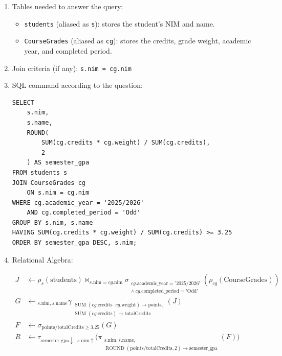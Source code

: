 \begin{enumerate}
    \itemsep0em
    \item Tables needed to answer the query:
    \begin{itemize}
        \item \texttt{students} (aliased as \texttt{s}): stores the student's NIM and name.
        \item \texttt{CourseGrades} (aliased as \texttt{cg}): stores the credits, grade weight, academic year, and completed period.
    \end{itemize}

    \item Join criteria (if any): \texttt{s.nim = cg.nim}

    \item SQL command according to the question:
    \begin{lstlisting}
SELECT
    s.nim,
    s.name,
    ROUND(
        SUM(cg.credits * cg.weight) / SUM(cg.credits),
        2
    ) AS semester_gpa
FROM students s
JOIN CourseGrades cg
    ON s.nim = cg.nim
WHERE cg.academic_year = '2025/2026'
    AND cg.completed_period = 'Odd'
GROUP BY s.nim, s.name
HAVING SUM(cg.credits * cg.weight) / SUM(cg.credits) >= 3.25
ORDER BY semester_gpa DESC, s.nim;
    \end{lstlisting}

    \item Relational Algebra:

    \begin{align*}
    J &\leftarrow
    \rho_s(\text{students})
    \bowtie_{s.\text{nim}=cg.\text{nim}}
    \sigma_{\substack{
        cg.\text{academic\_year}=\text{'2025/2026'}\\
        \land\
        cg.\text{completed\_period}=\text{'Odd'}
    }}(\rho_{cg}(\text{CourseGrades})) \\[4pt]
    G &\leftarrow
    {}_{s.\text{nim},s.\text{name}}
    \gamma_{\substack{
        \operatorname{SUM}(
        cg.\text{credits}\cdot cg.\text{weight}
        )\rightarrow\text{points},\\
        \operatorname{SUM}(cg.\text{credits})
        \rightarrow\text{totalCredits}
    }}(J) \\[4pt]
    F &\leftarrow
    \sigma_{\text{points}/\text{totalCredits}\ge 3.25}
    (G) \\[4pt]
    R &\leftarrow
    \tau_{\text{semester\_gpa}\downarrow,\,
           s.\text{nim}\uparrow}
    \Big(
    \pi_{\substack{
        s.\text{nim},s.\text{name},\\
        \operatorname{ROUND}(
        \text{points}/\text{totalCredits},2)
        \rightarrow\text{semester\_gpa}
    }}(F)
    \Big)
    \end{align*}


\end{enumerate}
